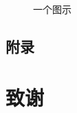 \documentclass[12pt,a4paper,oneside,openany]{book}
\begin{document}
\begin{figure}[!h]
\begin{center}
\fbox{\rule{0pt}{2in} \rule{0.9\linewidth}{0pt}}
\end{center}
\caption{一个图示}
\end{figure}

\nocite{*} %

\begin{appendix}

\chapter{附录}

\end{appendix}

\backmatter



\chapter{致\hspace{1.5em}谢}


\end{document}
